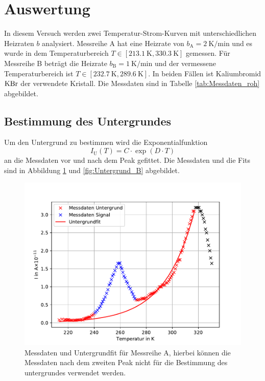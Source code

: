 \section{Auswertung}
\label{sec:auswertung}
In diesem Versuch werden zwei Temperatur-Strom-Kurven mit unterschiedlichen Heizraten $b$ analysiert.
Messreihe A hat eine Heizrate von $b_{\text{A}}=\SI{2}{\kelvin\per\minute}$ und es wurde in dem Temperaturbereich
$T\in\left[\SI{213.1}{\kelvin},\SI{330.3}{\kelvin}\right]$ gemessen. Für Messreihe B beträgt die Heizrate
$b_{\text{B}}=\SI{1}{\kelvin\per\minute}$ und der vermessene Temperaturbereich ist $T\in\left[\SI{232.7}{\kelvin},\SI{289.6}{\kelvin}\right]$.
In beiden Fällen ist Kaliumbromid $\ce{KBr}$ der verwendete Kristall. Die Messdaten sind in Tabelle \ref{tab:Messdaten_roh}
abgebildet. 
\subsection{Bestimmung des Untergrundes}
Um den Untergrund zu bestimmen wird die Exponentialfunktion
\begin{equation}
    I_{\text{U}}(T) = C\cdot\exp\left(D\cdot  T\right)
\end{equation}
an die Messdaten vor und nach dem Peak gefittet.
Die Messdaten und die Fits sind in Abbildung \ref{fig:Untergrund_A} und \ref{fig:Untergrund_B} abgebildet.
\FloatBarrier
\begin{figure}
    \centering
    \includegraphics[width =\textwidth, keepaspectratio]{figure/Untergrund_A.pdf}
    \caption{Messdaten und Untergrundfit für Messreihe A, hierbei können die Messdaten nach dem zweiten Peak nicht für die 
    Bestimmung des untergrundes verwendet werden.}
    \label{fig:Untergrund_A}
\end{figure}

